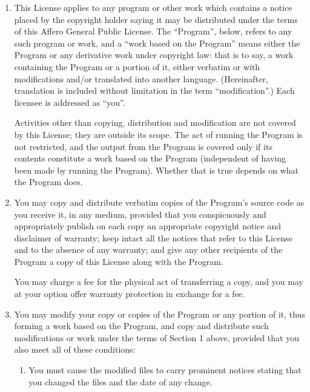\documentclass[11pt, letterpaper]{book}
\begin{document}
\begin{enumerate}

\addtocounter{enumi}{-1}
\item

This License applies to any program or other work which contains a
notice placed by the copyright holder saying it may be distributed
under the terms of this Affero General Public License.  The
``Program'', below, refers to any such program or work, and a ``work
based on the Program'' means either the Program or any derivative work
under copyright law: that is to say, a work containing the Program or
a portion of it, either verbatim or with modifications and/or
translated into another language.  (Hereinafter, translation is
included without limitation in the term ``modification''.)  Each
licensee is addressed as ``you''.

Activities other than copying, distribution and modification are not
covered by this License; they are outside its scope.  The act of
running the Program is not restricted, and the output from the Program
is covered only if its contents constitute a work based on the
Program (independent of having been made by running the Program).
Whether that is true depends on what the Program does.

\item You may copy and distribute verbatim copies of the Program's source
  code as you receive it, in any medium, provided that you conspicuously
  and appropriately publish on each copy an appropriate copyright notice
  and disclaimer of warranty; keep intact all the notices that refer to
  this License and to the absence of any warranty; and give any other
  recipients of the Program a copy of this License along with the Program.

You may charge a fee for the physical act of transferring a copy, and you
may at your option offer warranty protection in exchange for a fee.

\item

You may modify your copy or copies of the Program or any portion
of it, thus forming a work based on the Program, and copy and
distribute such modifications or work under the terms of Section 1
above, provided that you also meet all of these conditions:

\begin{enumerate}

\item

You must cause the modified files to carry prominent notices stating that
you changed the files and the date of any change.


\end{enumerate}
\end{enumerate}
\end{document}
